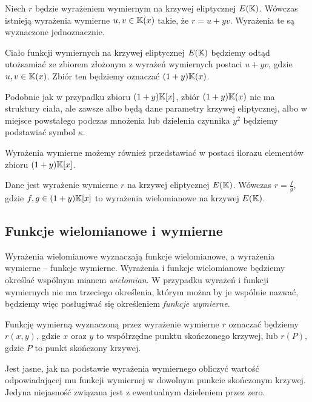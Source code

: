 \begin{theorem}
Niech $r$ będzie wyrażeniem wymiernym na krzywej eliptycznej $E(\mathbb{K})$.
Wówczas istnieją wyrażenia wymierne $u, v \in \mathbb{K}(x)$ takie,
że $r = u + yv$.
Wyrażenia te są wyznaczone jednoznacznie.
\end{theorem}

\begin{remark}
Ciało funkcji wymiernych na krzywej eliptycznej $E(\mathbb{K})$
będziemy odtąd utożsamiać ze zbiorem
złożonym z wyrażeń wymiernych postaci $u + yv$,
gdzie $u,v \in \mathbb{K}(x)$.
Zbiór ten będziemy oznaczać $(1 + y)\mathbb{K}(x)$.
\end{remark}

Podobnie jak w przypadku zbioru $(1 + y)\mathbb{K}[x]$,
zbiór $(1 + y)\mathbb{K}(x)$ nie ma struktury ciała,
ale zawsze albo będą dane parametry krzywej eliptycznej,
albo w miejsce powstałego podczas mnożenia lub dzielenia czynnika $y^2$
będziemy podstawiać symbol $\kappa$.

Wyrażenia wymierne możemy również przedstawiać w postaci ilorazu
elementów zbioru $(1 + y)\mathbb{K}[x]$.

\begin{theorem}
Dane jest wyrażenie wymierne $r$ na krzywej eliptycznej $E(\mathbb{K})$.
Wówczas $r = \frac{f}{g}$,
gdzie $f, g \in (1 + y)\mathbb{K}[x]$ to wyrażenia wielomianowe na krzywej $E(\mathbb{K})$.
\end{theorem}

\subsection*{Funkcje wielomianowe i wymierne}

Wyrażenia wielomianowe wyznaczają funkcje wielomianowe,
a wyrażenia wymierne -- funkcje wymierne.
Wyrażenia i funkcje wielomianowe będziemy określać
wspólnym mianem \emph{wielomian}.
W przypadku wyrażeń i funkcji wymiernych nie ma trzeciego określenia,
którym można by je wspólnie nazwać,
będziemy więc posługiwać się określeniem \emph{funkcje wymierne}.

\begin{remark}
Funkcję wymierną wyznaczoną przez wyrażenie wymierne $r$
oznaczać będziemy $r(x, y)$,
gdzie $x$ oraz $y$ to współrzędne punktu skończonego krzywej,
lub $r(P)$, gdzie $P$ to punkt skończony krzywej.
\end{remark}

Jest jasne, jak na podstawie wyrażenia wymiernego
obliczyć wartość odpowiadającej mu funkcji wymiernej
w dowolnym punkcie skończonym krzywej.
Jedyna niejasność związana jest z ewentualnym dzieleniem przez zero.

